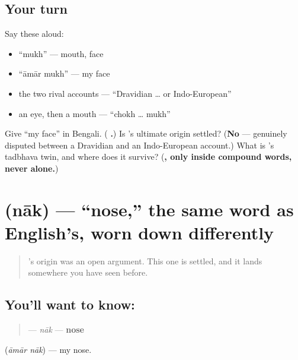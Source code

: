 \subsection*{Your turn}
Say these aloud:

\begin{itemize}
\raggedright
  \item \textquotedblleft{}mukh\textquotedblright{} — mouth, face
  \item \textquotedblleft{}āmār mukh\textquotedblright{} — my face
  \item the two rival accounts — \textquotedblleft{}Dravidian … or Indo-European\textquotedblright{}
  \item an eye, then a mouth — \textquotedblleft{}chokh … mukh\textquotedblright{}
\end{itemize}

\begin{tcolorbox}[breakable,colback=teal!4,colframe=teal!35!black,title={Before you move on}]
Give \textquotedblleft{}my face\textquotedblright{} in Bengali. (\textbf{ .}) Is 's ultimate origin settled? (\textbf{No} — genuinely disputed between a Dravidian and an Indo-European account.) What is 's tadbhava twin, and where does it survive? (\textbf{, only inside compound words, never alone.})
\end{tcolorbox}
\section[nāk]{ (nāk) — \textquotedblleft{}nose,\textquotedblright{} the same word as English's, worn down differently}

\label{lesson:BN-C12-nak}



\begin{quote}
's origin was an open argument. This one is settled, and it lands somewhere you have seen before.
\end{quote}

\subsection*{You'll want to know: }
\begin{quote}
\textbf{} — \emph{nāk} — \textbf{nose}
\end{quote}

\textbf{ } (\emph{āmār nāk}) — my nose.

